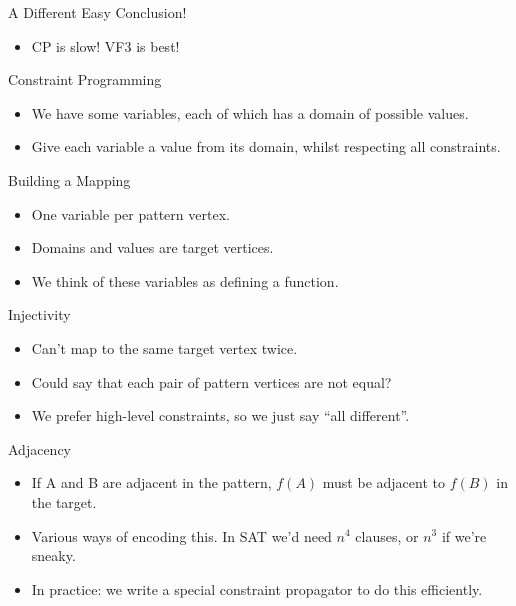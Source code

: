 \documentclass[aspectratio=169,compress,10pt]{beamer}
\begin{document}
\begin{frame}{A Different Easy Conclusion!}
    \begin{itemize}
        \item CP is slow! VF3 is best!
    \end{itemize}
\end{frame}

\begin{frame}{Constraint Programming}
    \begin{itemize}
        \item We have some \textcolor{uofgcobalt}{variables}, each of which has a
            \textcolor{uofgcobalt}{domain} of possible \textcolor{uofgcobalt}{values}.
        \item Give each variable a value from its domain, whilst respecting all
            \textcolor{uofgcobalt}{constraints}.
    \end{itemize}
\end{frame}

\begin{frame}{Building a Mapping}
    \begin{itemize}
        \item One variable per pattern vertex.
        \item Domains and values are target vertices.
        \item We think of these variables as defining a function.
    \end{itemize}
\end{frame}

\begin{frame}{Injectivity}
    \begin{itemize}
        \item Can't map to the same target vertex twice.
        \item Could say that each pair of pattern vertices are not equal?
        \item <2-> We prefer high-level constraints, so we just say ``all different''.
    \end{itemize}
\end{frame}

\begin{frame}{Adjacency}
    \begin{itemize}
        \item If A and B are adjacent in the pattern, $f(A)$ must be adjacent to $f(B)$
            in the target.
        \item Various ways of encoding this. In SAT we'd need $n^4$ clauses, or $n^3$ if
            we're sneaky.
        \item In practice: we write a special constraint propagator to do this efficiently.
    \end{itemize}
\end{frame}
\end{document}

